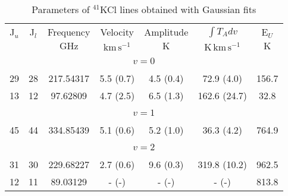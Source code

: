 \begin{table*}[htp]
\centering
\caption{Parameters of $^{41}$KCl lines obtained with Gaussian fits}
\begin{tabular}{ccccccc}
\label{tab:41KCl_salt_lines}
 J$_u$ & J$_l$ & Frequency & Velocity & Amplitude & $\int T_A dv$ & E$_U$ \\
  &  & $\mathrm{GHz}$ & $\mathrm{km\,s^{-1}}$ & $\mathrm{K}$ & $\mathrm{K\,km\,s^{-1}}$ & $\mathrm{K}$ \\
\hline
&\vspace{-0.75em}\\
\multicolumn{7}{c}{$v = 0$} \\
\vspace{-0.75em}\\
 29 & 28 & 217.54317 & 5.5 (0.7) & 4.5 (0.4) & 72.9 (4.0) & 156.7 \\
 13 & 12 & 97.62809 & 4.7 (2.5) & 6.5 (1.3) & 162.6 (24.7) & 32.8 \\
&\vspace{-0.75em}\\
\multicolumn{7}{c}{$v = 1$} \\
\vspace{-0.75em}\\
 45 & 44 & 334.85439 & 5.1 (0.6) & 5.2 (1.0) & 36.3 (4.2) & 764.9 \\
&\vspace{-0.75em}\\
\multicolumn{7}{c}{$v = 2$} \\
\vspace{-0.75em}\\
 31 & 30 & 229.68227 & 2.7 (0.6) & 9.6 (0.3) & 319.8 (10.2) & 962.5 \\
 12 & 11 & 89.03129 & - (-) & - (-) & - (-) & 813.8 \\
\hline
\end{tabular}

\par 
\end{table*}
